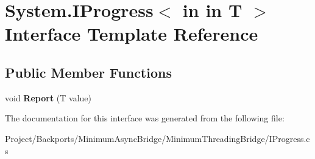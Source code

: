 \hypertarget{interface_system_1_1_i_progress}{}\section{System.\+I\+Progress$<$ in in T $>$ Interface Template Reference}
\label{interface_system_1_1_i_progress}
\subsection*{Public Member Functions}
\begin{DoxyCompactItemize}
\item 
\mbox{\label{interface_system_1_1_i_progress_a5ddfc2ac025b1df2dfe8b6d6c0cfd5cc}} 
void {\bfseries Report} (T value)
\end{DoxyCompactItemize}


The documentation for this interface was generated from the following file\+:\begin{DoxyCompactItemize}
\item 
Project/\+Backports/\+Minimum\+Async\+Bridge/\+Minimum\+Threading\+Bridge/I\+Progress.\+cs\end{DoxyCompactItemize}
